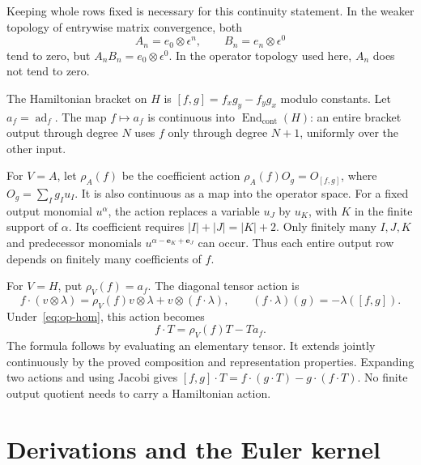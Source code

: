 Keeping whole rows fixed is necessary for this continuity statement.
In the weaker topology of entrywise matrix convergence, both
\[
 A_n=e_0\otimes\epsilon^n,\qquad
 B_n=e_n\otimes\epsilon^0
\]
tend to zero, but $A_nB_n=e_0\otimes\epsilon^0$.
In the operator topology used here, $A_n$ does not tend to zero.

The Hamiltonian bracket on $H$ is $[f,g]=f_xg_y-f_yg_x$ modulo constants.
Let $a_f=\operatorname{ad}_f$. The map
$f\mapsto a_f$ is continuous into $\operatorname{End}_{\mathrm{cont}}(H)$:
an entire bracket output through degree $N$ uses $f$ only through
degree $N+1$, uniformly over the other input.

For $V=A$, let $\rho_A(f)$ be the coefficient action
$\rho_A(f)O_g=O_{[f,g]}$, where $O_g=\sum_Ig_Iu_I$.
It is also continuous as a map into the operator space. For a fixed
output monomial $u^\alpha$, the action replaces a variable $u_J$
by $u_K$, with $K$ in the finite support of $\alpha$. Its coefficient
requires $|I|+|J|=|K|+2$. Only finitely many $I,J,K$ and predecessor
monomials $u^{\alpha-\mathbf e_K+\mathbf e_J}$ can occur.
Thus each entire output row depends on finitely many coefficients of $f$.

For $V=H$, put $\rho_V(f)=a_f$. The diagonal tensor action is
\[
 f\cdot(v\otimes\lambda)
  =\rho_V(f)v\otimes\lambda+v\otimes(f\cdot\lambda),
 \qquad(f\cdot\lambda)(g)=-\lambda([f,g]).
\]
Under~\eqref{eq:op-hom}, this action becomes
\begin{equation}
 f\cdot T=\rho_V(f)T-Ta_f.
 \label{eq:op-diagonal}
\end{equation}
The formula follows by evaluating an elementary tensor. It extends
jointly continuously by the proved composition and representation
properties. Expanding two actions and using Jacobi gives
$[f,g]\cdot T=f\cdot(g\cdot T)-g\cdot(f\cdot T)$.
No finite output quotient needs to carry a Hamiltonian action.

\section{Derivations and the Euler kernel}

